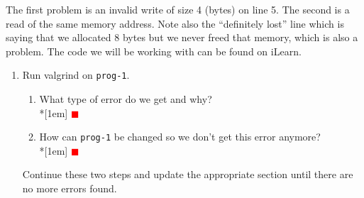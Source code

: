 \documentclass[12pt]{article}
\newcounter{problem}
\newcommand{\TODO}{\textcolor{red}{$\blacksquare$}}
\begin{document}
The first problem is an invalid write of size 4 (bytes) on line 5. The second is
a read of the same memory address. Note also the ``definitely lost'' line which
is saying that we allocated 8 bytes but we never freed that memory, which is also
a problem.  The code we will be working with can be found on iLearn.

\begin{enumerate}
\item Run valgrind on \texttt{prog-1}.
\begin{enumerate}
\item What type of error do we get and why?\\*[1em]
  \TODO
\item How can \texttt{prog-1} be changed so we don't get this error anymore?\\*[1em]
  \TODO
\end{enumerate}
Continue these two steps and update the appropriate section until there are no more errors found.


\end{enumerate}
\end{document}
